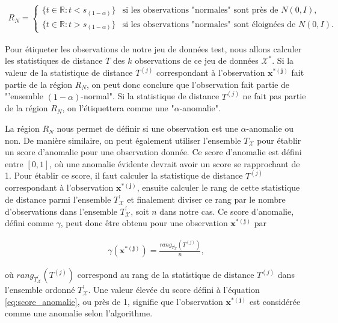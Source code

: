 \begin{gather} \label{eq:region}
	R_{N} = 
	\begin{cases} 
		\big\{t \in \mathbb{R}: t < s_{(1 - \alpha)} \big\} & \text{si les observations "normales" sont près de $N(0, I)$}, \\
		\big\{t \in \mathbb{R}: t > s_{(1 - \alpha)} \big\} & \text{si les observations "normales" sont éloignées de $N(0, I)$}.
	\end{cases}
\end{gather}

Pour étiqueter les observations de notre jeu de données test, nous allons calculer les statistiques de distance $T$ des $k$ observations de ce jeu de données $\mathcal{X^*}$. Si la valeur de la statistique de distance $T^{(j)}$ correspondant à l'observation $\boldsymbol{x^{*(j)}}$ fait partie de la région $R_N$, on peut donc conclure que l'observation fait partie de "'ensemble $(1-\alpha)$-normal". Si la statistique de distance $T^{(j)}$ ne fait pas partie de la région $R_N$, on l'étiquettera comme une "$\alpha$-anomalie".

La région $R_N$ nous permet de définir si une observation est une $\alpha$-anomalie ou non. De manière similaire, on peut également utiliser l'ensemble $T_{\mathcal{X}}$ pour établir un score d'anomalie pour une observation donnée. Ce score d'anomalie est défini entre $[0,1]$, où une anomalie évidente devrait avoir un score se rapprochant de 1. Pour établir ce score, il faut calculer la statistique de distance $T^{(j)}$ correspondant à l'observation $\boldsymbol{x^{*(j)}}$, ensuite calculer le rang de cette statistique de distance parmi l'ensemble $T^{'}_{\mathcal{X}}$ et finalement diviser ce rang par le nombre d'observations dans l'ensemble $T^{'}_{\mathcal{X}}$, soit $n$ dans notre cas. Ce score d'anomalie, défini comme $\gamma$, peut donc être obtenu pour une observation $\boldsymbol{x^{*(j)}}$ par

\begin{gather} \label{eq:score_anomalie}
	\gamma(\boldsymbol{x^{*(j)}}) = \frac{rang_{T^{'}_{\mathcal{X}}}(T^{(j)})}{n},
\end{gather}

où $rang_{T^{'}_{\mathcal{X}}}(T^{(j)})$ correspond au rang de la statistique de distance $T^{(j)}$ dans l'ensemble ordonné $T^{'}_{\mathcal{X}}$. Une valeur élevée du score défini à l'équation \ref{eq:score_anomalie}, ou près de 1, signifie que l'observation $\boldsymbol{x^{*(j)}}$ est considérée comme une anomalie selon l'algorithme.

